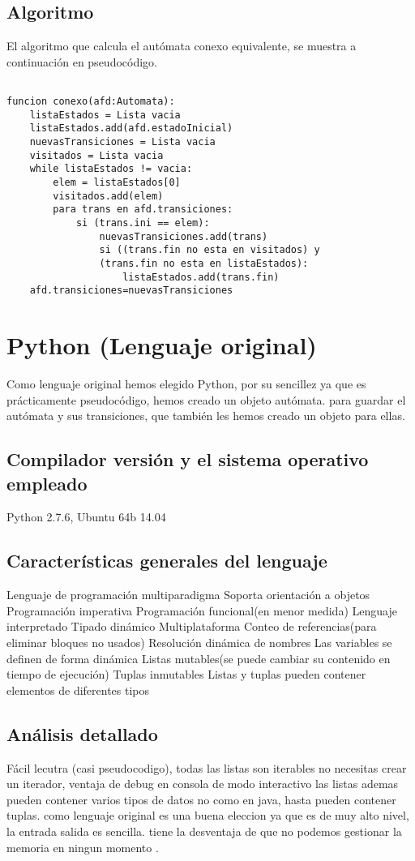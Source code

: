 \documentclass[12pt,a4paper]{article}
\begin{document}
\subsection{Algoritmo}
El algoritmo que calcula el autómata conexo equivalente, se muestra a 
continuación en pseudocódigo.
\begin{lstlisting}

funcion conexo(afd:Automata):
	listaEstados = Lista vacia
	listaEstados.add(afd.estadoInicial)
	nuevasTransiciones = Lista vacia
	visitados = Lista vacia
	while listaEstados != vacia:
		elem = listaEstados[0]
		visitados.add(elem)
		para trans en afd.transiciones:
			si (trans.ini == elem):
				nuevasTransiciones.add(trans)
				si ((trans.fin no esta en visitados) y
				(trans.fin no esta en listaEstados):
					listaEstados.add(trans.fin)					
	afd.transiciones=nuevasTransiciones

\end{lstlisting}

\section{Python (Lenguaje original)}

Como lenguaje original hemos elegido Python, por su sencillez ya que es
prácticamente pseudocódigo, hemos creado un objeto autómata. para guardar el
autómata y sus transiciones, que también les hemos creado un objeto para ellas.

\subsection{Compilador versión y el sistema operativo empleado}
Python 2.7.6, Ubuntu 64b 14.04


\subsection{Características generales del lenguaje}
  Lenguaje de programación multiparadigma
  Soporta orientación a objetos 
  Programación imperativa 
  Programación funcional(en menor medida) 
  Lenguaje interpretado
  Tipado dinámico
  Multiplataforma
  Conteo de referencias(para eliminar bloques no usados)
  Resolución dinámica de nombres
  Las variables se definen de forma dinámica
  Listas mutables(se puede cambiar su contenido en tiempo de ejecución)
  Tuplas inmutables
  Listas y tuplas pueden contener elementos de diferentes tipos
  
  \subsection{Análisis detallado}
  Fácil lecutra (casi pseudocodigo), todas las listas son iterables no necesitas crear un iterador, ventaja de debug en consola de modo interactivo
  las listas ademas pueden contener varios tipos de datos no como en java, hasta pueden contener tuplas. como lenguaje original es una buena eleccion ya
   que es de muy alto nivel, la entrada salida es sencilla. tiene la desventaja de que no podemos gestionar la memoria en ningun momento .
    
\end{document}
